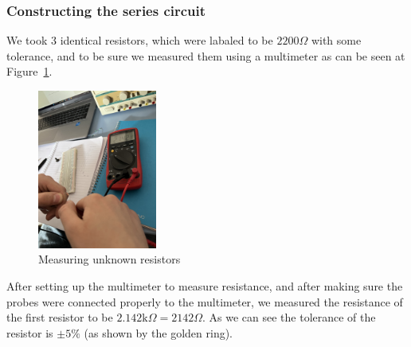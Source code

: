 \documentclass[a4paper, 10pt]{article}
\newcommand{\figref}[1]{Figure~\ref{#1}}
\begin{document}
				\subsubsection{Constructing the series circuit}
					We took 3 identical resistors, which were labaled to be $2200\Omega$ with some tolerance, and to be sure we measured them using a multimeter as can be seen at \figref{fig:MeasuringUnknownResistors}.
					\begin{figure}[h!]
						\centering
						\includegraphics[width=0.35\textwidth]{./images/MeasuringUnknownResistors.jpeg}
						\caption{Measuring unknown resistors}
						\label{fig:MeasuringUnknownResistors}
					\end{figure}

				After setting up the multimeter to measure resistance, and after making sure the probes were connected properly to the multimeter,
				we measured the resistance of the first resistor to be $2.142\text{k}\Omega = 2142\Omega$. As we can see the tolerance of the resistor is $\pm 5\%$ (as shown by the golden ring).

				\vspace{5mm}
\end{document}
